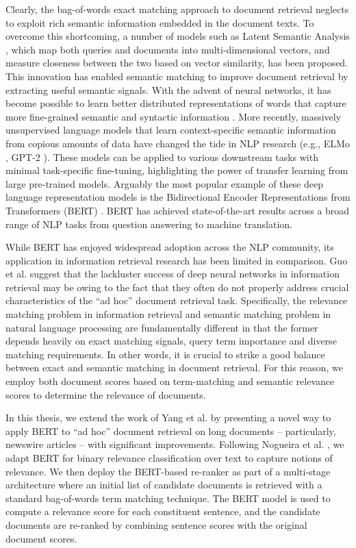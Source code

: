 Clearly, the bag-of-words exact matching approach to document retrieval neglects to exploit rich semantic information embedded in the document texts.
To overcome this shortcoming, a number of models such as Latent Semantic Analysis \cite{deerwester1990indexing}, which map both queries and documents into multi-dimensional vectors, and measure closeness between the two based on vector similarity, has been proposed.
This innovation has enabled semantic matching to improve document retrieval by extracting useful semantic signals.
With the advent of neural networks, it has become possible to learn better distributed representations of words that capture more fine-grained semantic and syntactic information \cite{mikolov2013distributed, pennington2014glove}.
More recently, massively unsupervised language models that learn context-specific semantic information from copious amounts of data have changed the tide in NLP research (e.g., ELMo \cite{peters2018deep}, GPT-2 \cite{radford2019language}).
These models can be applied to various downstream tasks with minimal task-specific fine-tuning, highlighting the power of transfer learning from large pre-trained models.
Arguably the most popular example of these deep language representation models is the Bidirectional Encoder Representations from Transformers (BERT) \cite{devlin2018bert}.
BERT has achieved state-of-the-art results across a broad range of NLP tasks from question answering to machine translation.

While BERT has enjoyed widespread adoption across the NLP community, its application in information retrieval research has been limited in comparison.
Guo et al. \cite{guo2016deep} suggest that the lackluster success of deep neural networks in information retrieval may be owing to the fact that they often do not properly address crucial characteristics of the ``ad hoc'' document retrieval task.
Specifically, the relevance matching problem in information retrieval and semantic matching problem in natural language processing are fundamentally different in that the former depends heavily on exact matching signals, query term importance and diverse matching requirements.
In other words, it is crucial to strike a good balance between exact and semantic matching in document retrieval.
For this reason, we employ both document scores based on term-matching and semantic relevance scores to determine the relevance of documents.

In this thesis, we extend the work of Yang et al. \cite{yang2019simple} by presenting a novel way to apply BERT to ``ad hoc'' document retrieval on long documents -- particularly, newswire articles -- with significant improvements.
Following Nogueira et al. \cite{nogueira2019passage}, we adapt BERT for binary relevance classification over text to capture notions of relevance.
We then deploy the BERT-based re-ranker as part of a multi-stage architecture where an initial list of candidate documents is retrieved with a standard bag-of-words term matching technique.
The BERT model is used to compute a relevance score for each constituent sentence, and the candidate documents are re-ranked by combining sentence scores with the original document scores.

